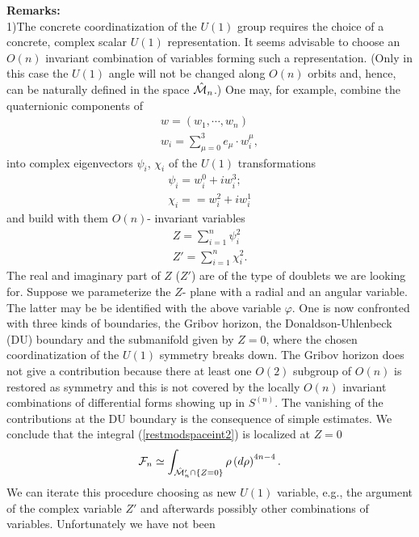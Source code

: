 \documentclass[a4paper,12pt]{article}
\begin{document}
{\bf Remarks:} \\
1)The concrete coordinatization of the $U(1)$ group requires the choice 
of a concrete, complex scalar $U(1)$ representation. It seems 
advisable to choose an $O(n)$ invariant combination of variables 
forming such a representation. (Only in this case the $U(1)$ angle 
will not be changed along $O(n)$ orbits and, hence, can be naturally 
defined in the space $\hat{{\cal M}}_n$.)
One may, for example, combine the quaternionic components of 
\begin{eqnarray}
w=\left(w_1, \cdots ,w_n \right) \\
w_i= \sum_{\mu=0}^3 e_{\mu} \cdot w_i^{\mu},
\end{eqnarray} 
 into complex eigenvectors $\psi_i$, $\chi_i$ of the $U(1)$ 
transformations 
\begin{eqnarray}
\psi_i=w_i^0+iw_i^3; \nonumber \\
\chi_i==w_i^2+iw_i^1 \nonumber 
\end{eqnarray}
and build with them $O(n)$- invariant variables 
\begin{eqnarray}
Z=\sum_{i=1}^n  \psi_i^2 \nonumber \\
Z'=\sum_{i=1}^n  \chi_i^2 \nonumber .
\end{eqnarray}
The real and imaginary part of $Z$ ($Z'$) are of the type of doublets 
we are looking for. Suppose we parameterize the $Z$- plane with a 
radial and an angular variable. The latter may be be identified 
with the above variable $\varphi$. One is now confronted with three 
kinds of boundaries, the Gribov horizon, the Donaldson-Uhlenbeck 
(DU) boundary and the submanifold given by $Z=0$, where the 
chosen coordinatization of the $U(1)$ symmetry breaks down.  
The Gribov horizon does not give a contribution because there at 
least one $O(2)$ subgroup of $O(n)$ is restored as symmetry and 
this is not covered by the locally $O(n)$ invariant combinations 
of differential forms showing up in $S^{(n)}$. The vanishing 
of the contributions at the DU boundary is the consequence of simple 
estimates. We conclude that the integral (\ref{restmodspaceint2}) 
is localized at $Z=0$ 
\begin{equation}
{\cal F}_n \simeq \int_{\hat{{\cal M}}'_n \cap \{Z=0\}} 
\rho \left(d\rho \right)^{4n-4}. 
\label{restmodspaceint3}
\end{equation}          
We can iterate this procedure choosing as new $U(1)$ variable, e.g., the 
argument of the complex variable $Z'$ and afterwards possibly 
other combinations of variables. Unfortunately we have not been 
\end{document}

